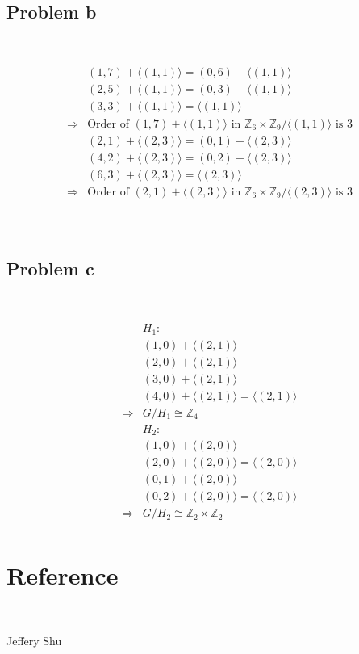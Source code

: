 \documentclass{article}
\begin{document}
~

\subsection*{Problem b}

~

\begin{equation*}
    \begin{split}
        &(1,7)+\langle(1,1)\rangle=(0,6)+\langle(1,1)\rangle\\
        &(2,5)+\langle(1,1)\rangle=(0,3)+\langle(1,1)\rangle\\
        &(3,3)+\langle(1,1)\rangle=\langle(1,1)\rangle\\
        \Rightarrow&\text{Order of }(1,7)+\langle(1,1)\rangle\text{ in }\mathbb{Z} _6\times\mathbb{Z} _9/\langle(1,1)\rangle \text{ is }3\\
        &(2,1)+\langle(2,3)\rangle=(0,1)+\langle(2,3)\rangle\\
        &(4,2)+\langle(2,3)\rangle=(0,2)+\langle(2,3)\rangle\\
        &(6,3)+\langle(2,3)\rangle=\langle(2,3)\rangle\\
        \Rightarrow&\text{Order of }(2,1)+\langle(2,3)\rangle\text{ in }\mathbb{Z} _6\times\mathbb{Z} _9/\langle(2,3)\rangle \text{ is }3\\
    \end{split}
\end{equation*}

~

\subsection*{Problem c}

~

\begin{equation*}
    \begin{split}
        &H_1:\\
        &(1,0)+\langle(2,1)\rangle\\
        &(2,0)+\langle(2,1)\rangle\\
        &(3,0)+\langle(2,1)\rangle\\
        &(4,0)+\langle(2,1)\rangle=\langle(2,1)\rangle\\
        \Rightarrow&G/H_1\cong \mathbb{Z} _4\\
        &H_2:\\
        &(1,0)+\langle(2,0)\rangle\\
        &(2,0)+\langle(2,0)\rangle=\langle(2,0)\rangle\\
        &(0,1)+\langle(2,0)\rangle\\
        &(0,2)+\langle(2,0)\rangle=\langle(2,0)\rangle\\
        \Rightarrow&G/H_2\cong \mathbb{Z} _2\times\mathbb{Z} _2\\
    \end{split}
\end{equation*}

\newpage

\section*{Reference}

~

Jeffery Shu
\end{document}
